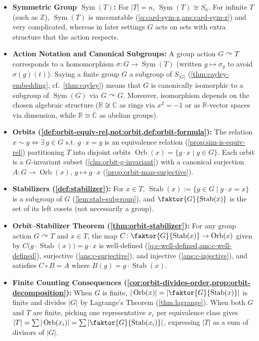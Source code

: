 \begin{overview}
\begin{itemize}
    \item \textbf{Symmetric Group $\operatorname{Sym}(T)$:} For $|T| = n$, $\operatorname{Sym}(T) \cong S_n$. For infinite $T$ (such as $\mathbb{Z}$), $\operatorname{Sym}(T)$ is uncountable (\cref{q:card-sym-z,ans:card-sym-z}) and very complicated, whereas in later settings $G$ acts on sets with extra structure that the action respects.
    \item \textbf{Action Notation and Canonical Subgroups:} A group action $G \curvearrowright T$ corresponds to a homomorphism $\sigma \colon G \to \operatorname{Sym}(T)$ (written $g \mapsto \sigma_g$ to avoid $\sigma(g)(t)$). Saying a finite group $G$  a subgroup of $S_{|G|}$ (\cref{thm:cayley-embedding}, cf.\ \cref{thm:cayley}) means that $G$ is canonically isomorphic to a subgroup of $\operatorname{Sym}(G)$ via $G \curvearrowright G$. Moreover, isomorphism depends on the chosen algebraic structure ($\mathbb{R} \not\cong \mathbb{C}$ as rings via $x^2 = -1$ or as $\mathbb{R}$-vector spaces via dimension, while $\mathbb{R} \cong \mathbb{C}$ as abelian groups).
    \item \textbf{Orbits (\cref{def:orbit-equiv-rel,not:orbit,def:orbit-formula}):} The relation $x \sim y \iff \exists\, g \in G \text{ s.t.\ } g \cdot x = y$ is an equivalence relation (\cref{prop:sim-is-equiv-rel}) partitioning $T$ into disjoint orbits $\operatorname{Orb}(x) = \{ g \cdot x \mid g \in G \}$. Each orbit is a $G$-invariant subset (\cref{clm:orbit-g-invariant}) with a canonical surjection $A \colon G \to \operatorname{Orb}(x)$, $g \mapsto g \cdot x$ (\cref{prop:orbit-map-surjective}).
    \item \textbf{Stabilizers (\cref{def:stabilizer}):} For $x \in T$, $\operatorname{Stab}(x) := \{ g \in G \mid g \cdot x = x \}$ is a subgroup of $G$ (\cref{lem:stab-subgroup}), and $\faktor{G}{\operatorname{Stab}(x)}$ is the set of its left cosets (not necessarily a group).
    \item \textbf{Orbit--Stabilizer Theorem (\cref{thm:orbit-stabilizer}):} For any group action $G \curvearrowright T$ and $x \in T$, the map $C \colon \faktor{G}{\operatorname{Stab}(x)} \to \operatorname{Orb}(x)$ given by $C\bigl(g \cdot \operatorname{Stab}(x)\bigr) = g \cdot x$ is well-defined (\cref{q:c-well-defined,ans:c-well-defined}), surjective (\cref{ans:c-surjective}), and injective (\cref{ans:c-injective}), and satisfies $C \circ B = A$ where $B(g) = g \cdot \operatorname{Stab}(x)$.
    \item \textbf{Finite Counting Consequences (\cref{cor:orbit-divides-order,prop:orbit-decomposition}):} When $G$ is finite, $|\operatorname{Orb}(x)| = \left| \faktor{G}{\operatorname{Stab}(x)} \right|$ is finite and divides $|G|$ by Lagrange's Theorem (\cref{thm:lagrange}). When both $G$ and $T$ are finite, picking one representative $x_i$ per equivalence class gives $|T| = \sum |\operatorname{Orb}(x_i)| = \sum \left| \faktor{G}{\operatorname{Stab}(x_i)} \right|$, expressing $|T|$ as a sum of divisors of $|G|$.
\end{itemize}
\end{overview}
